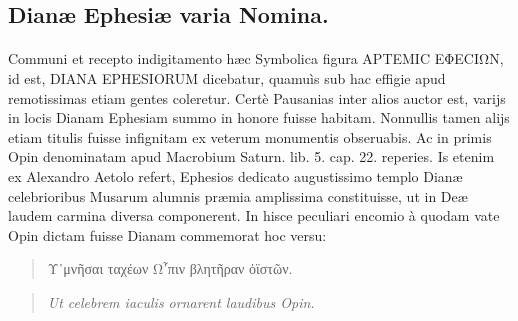 \documentclass[a4paper, 11pt, oneside, polutonikogreek, latin]{article}
\begin{document}
\subsection{Dianæ Ephesiæ varia Nomina.}
\paragraph{}
Communi et recepto indigitamento hæc Symbolica figura ΑΡΤΕΜΙC ΕΦΕCΙΩΝ, id est, DIANA EPHESIORUM dicebatur, quamuìs sub hac effigie apud remotissimas etiam gentes coleretur. Certè Pausanias inter alios auctor est, varijs in locis Dianam Ephesiam summo in honore fuisse habitam. Nonnullis tamen alijs etiam titulis fuisse infignitam ex veterum monumentis obseruabis. Ac in primis Opin denominatam apud Macrobium Saturn. lib. 5. cap. 22. reperies. Is etenim ex Alexandro Aetolo refert, Ephesios dedicato augustissimo templo Dianæ celebrioribus Musarum alumnis præmia amplissima constituisse, ut in Deæ laudem carmina diversa componerent. In hisce peculiari encomio à quodam vate Opin dictam fuisse Dianam commemorat hoc versu:
\begin{quote}
Υ῾μνῆσαι ταχέων Ω῏πιν βλητῆραν ὀϊστῶν.
\end{quote}
\begin{quote}
\emph{Ut celebrem iaculis ornarent laudibus Opin.}
\end{quote}
\vspace*{-4mm}
\end{document}
